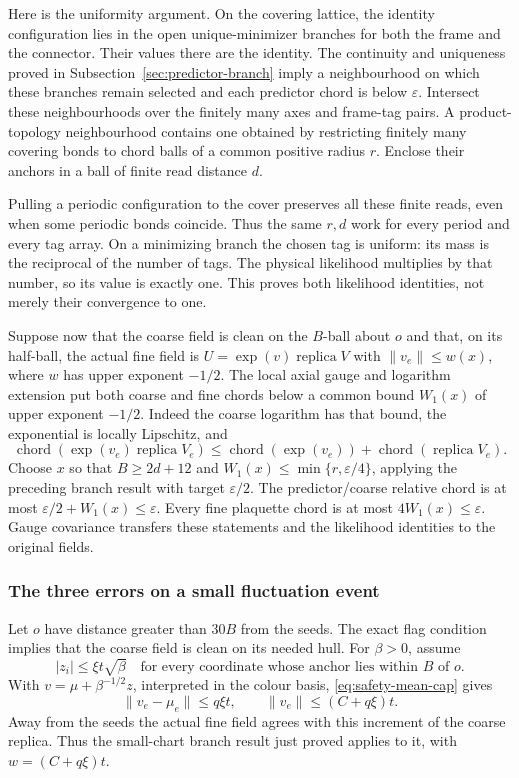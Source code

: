 Here is the uniformity argument. On the covering lattice, the identity
configuration lies in the open unique-minimizer branches for both
the frame and the connector. Their values there are the identity.
The continuity and uniqueness proved in
Subsection~\ref{sec:predictor-branch} imply a neighbourhood on which these
branches remain selected and each predictor chord is below
$\varepsilon$. Intersect these neighbourhoods over the finitely many
axes and frame-tag pairs. A product-topology neighbourhood contains
one obtained by restricting finitely many covering bonds to chord
balls of a common positive radius $r$. Enclose their anchors in a
ball of finite read distance $d$.

Pulling a periodic configuration to the cover preserves all these
finite reads, even when some periodic bonds coincide. Thus the same
$r,d$ work for every period and every tag array. On a minimizing
branch the chosen tag is uniform: its mass is the reciprocal of the
number of tags. The physical likelihood multiplies by that number,
so its value is exactly one. This proves both likelihood identities,
not merely their convergence to one.

Suppose now that the coarse field is clean on the $B$-ball about $o$
and that, on its half-ball, the actual fine field is
$U=\exp(v)\operatorname{replica}V$ with $\|v_e\|\le w(x)$,
where $w$ has upper exponent $-1/2$. The local axial gauge and logarithm
extension put both coarse and fine chords below a common bound
$W_1(x)$ of upper exponent $-1/2$. Indeed the coarse logarithm has
that bound, the exponential is locally Lipschitz, and
\[
 \operatorname{chord}(\exp(v_e)\operatorname{replica}V_e)
 \le\operatorname{chord}(\exp(v_e))
                 +\operatorname{chord}(\operatorname{replica}V_e).
\]
Choose $x$ so that $B\ge2d+12$ and
$W_1(x)\le\min\{r,\varepsilon/4\}$, applying the preceding branch
result with target $\varepsilon/2$. The predictor/coarse relative chord
is at most $\varepsilon/2+W_1(x)\le\varepsilon$. Every fine plaquette
chord is at most $4W_1(x)\le\varepsilon$. Gauge covariance transfers
these statements and the likelihood identities to the original fields.

\subsubsection{The three errors on a small fluctuation event}
Let $o$ have distance greater than $30B$ from the seeds. The exact
flag condition implies that the coarse field is clean on its needed
hull. For $\beta>0$, assume
\begin{equation}\label{eq:safety-watch}
 |z_i|\le\xi t\sqrt\beta
       \quad\text{for every coordinate whose anchor lies within }B
       \text{ of }o.
\end{equation}
With $v=\mu+\beta^{-1/2}z$, interpreted in the colour basis,
\eqref{eq:safety-mean-cap} gives
\[
              \|v_e-\mu_e\|\le q\xi t,
                  \qquad \|v_e\|\le(C+q\xi)t.
\]
Away from the seeds the actual fine field agrees with this increment
of the coarse replica. Thus the small-chart branch result just proved
applies to it, with $w=(C+q\xi)t$.


